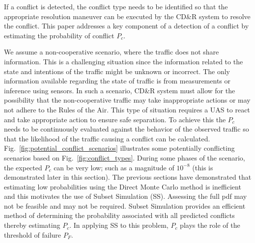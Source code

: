 \documentclass[journal]{IEEEtran}
\begin{document}
\begin{figure*}\centering	
	\hfill 
  \hfill
	\caption{These figures illustrate the geometric configuration of the different conflicts that might be encountered within a block of airspace. This includes different maneuvers required to be executed by the respective parities to resolve the conflict.}
	\label{fig:conflict_types}
\end{figure*}

If a conflict is detected, the conflict type needs to be identified so that the appropriate resolution maneuver can be executed by the CD\&R system to resolve the conflict. This paper addresses a key component of a detection of a conflict by estimating the probability of conflict $P_{c}$.

We assume a non-cooperative scenario, where the traffic does not share information. This is a challenging situation since the information related to the state and intentions of the traffic might be unknown or incorrect. The only information available regarding the state of traffic is from measurements or inference using sensors. In such a scenario, CD\&R system must allow for the possibility that the non-cooperative traffic may take inappropriate actions or may not adhere to the Rules of the Air. This type of situation requires a UAS to react and take appropriate action to ensure safe separation. To achieve this the $P_{c}$ needs to be continuously evaluated against the behavior of the observed traffic so that the likelihood of the traffic causing a conflict can be calculated. Fig.~\ref{fig:potential_conflict_scenarios} illustrates some potentially conflicting scenarios based on Fig.~\ref{fig:conflict_types}. During some phases of the scenario, the expected $P_{c}$ can be very low; such as a magnitude of $10^{-8}$ (this is demonstrated later in this section). The previous sections have demonstrated that estimating low probabilities using the Direct Monte Carlo method is inefficient and this motivates the use of Subset Simulation (SS). Assessing the full pdf may not be feasible and may not be required. Subset Simulation provides an efficient method of determining the probability associated with all predicted conflicts thereby estimating $P_{c}$. In applying SS to this problem, $P_{c}$ plays the role of the threshold of failure $P_{F}$.
\end{document}
